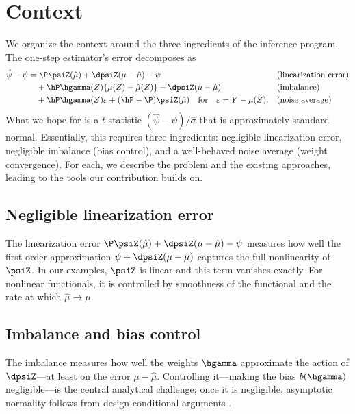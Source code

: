 \documentclass{article}
\begin{document}
\section{Context}
\label{sec:context}
We organize the context around the three ingredients
of the inference program.
The one-step estimator's error decomposes as
\begin{equation}\label{eq:decomposition}
\begin{aligned}
\hat\psi - \psi
&= \P\psiZ(\hat\mu) + \dpsiZ(\mu - \hat\mu) - \psi
  && \text{(linearization error)} \\
&\quad+ \hP \hgamma(Z)\{\mu(Z) - \hat\mu(Z)\}
       - \dpsiZ(\mu - \hat\mu)
  && \text{(imbalance)} \\
&\quad+ \hP \hgamma(Z)\varepsilon
       + (\hP - \P)\psiZ(\hat\mu) \qfor \varepsilon = Y - \mu(Z).
  && \text{(noise average)}
\end{aligned}
\end{equation}
What we hope for is a $t$-statistic
$(\hat\psi - \psi)/\hat\sigma$
that is approximately standard normal.
Essentially, this requires three ingredients:
negligible linearization error,
negligible imbalance (bias control),
and a well-behaved noise average (weight convergence).
For each, we describe the problem
and the existing approaches,
leading to the tools our contribution builds on.

\subsection{Negligible linearization error}
\label{sec:linearization}
The linearization error
$\P\psiZ(\hat\mu) + \dpsiZ(\mu - \hat\mu) - \psi$
measures how well the first-order approximation
$\psi + \dpsiZ(\mu - \hat\mu)$ captures
the full nonlinearity of $\psiZ$.
In our examples, $\psiZ$ is linear
and this term vanishes exactly.
For nonlinear functionals,
it is controlled by smoothness of the functional
and the rate at which $\hat\mu \to \mu$.

\subsection{Imbalance and bias control}
\label{sec:imbalance-bias}
The imbalance measures how well
the weights $\hgamma$ approximate
the action of $\dpsiZ$---at least on
the error $\mu - \hat\mu$.
Controlling it---making
the bias $b(\hgamma)$ negligible---is
the central analytical challenge;
once it is negligible,
asymptotic normality follows
from design-conditional arguments
\citep{benmichael2021balancing,pham2023stable}.
\end{document}
